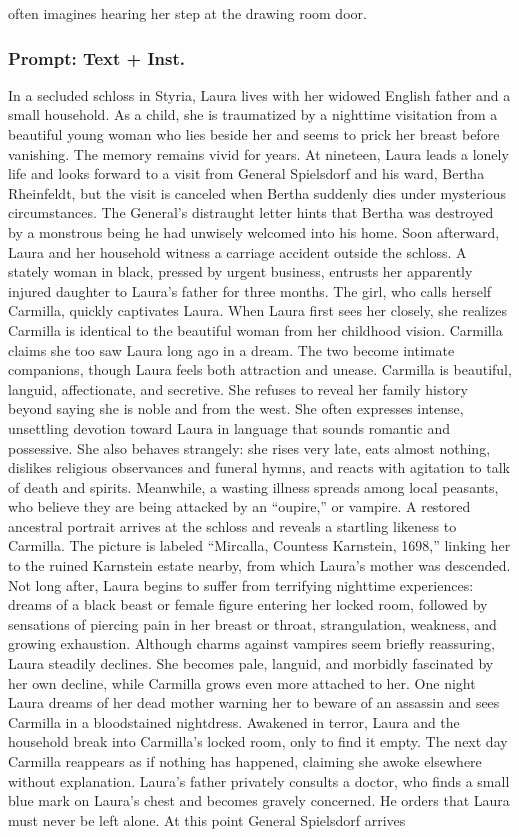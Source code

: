 \documentclass{article} %
\begin{document}
often imagines hearing her step at the drawing room door.

\subsubsection{Prompt: Text + Inst.}

In a secluded schloss in Styria, Laura lives with her widowed English father and a small household. As a child, she is traumatized by a nighttime visitation from a beautiful young woman who lies beside her and seems to prick her breast before vanishing. The memory remains vivid for years. At nineteen, Laura leads a lonely life and looks forward to a visit from General Spielsdorf and his ward, Bertha Rheinfeldt, but the visit is canceled when Bertha suddenly dies under mysterious circumstances. The General’s distraught letter hints that Bertha was destroyed by a monstrous being he had unwisely welcomed into his home. Soon afterward, Laura and her household witness a carriage accident outside the schloss. A stately woman in black, pressed by urgent business, entrusts her apparently injured daughter to Laura’s father for three months. The girl, who calls herself Carmilla, quickly captivates Laura. When Laura first sees her closely, she realizes Carmilla is identical to the beautiful woman from her childhood vision. Carmilla claims she too saw Laura long ago in a dream. The two become intimate companions, though Laura feels both attraction and unease. Carmilla is beautiful, languid, affectionate, and secretive. She refuses to reveal her family history beyond saying she is noble and from the west. She often expresses intense, unsettling devotion toward Laura in language that sounds romantic and possessive. She also behaves strangely: she rises very late, eats almost nothing, dislikes religious observances and funeral hymns, and reacts with agitation to talk of death and spirits. Meanwhile, a wasting illness spreads among local peasants, who believe they are being attacked by an “oupire,” or vampire. A restored ancestral portrait arrives at the schloss and reveals a startling likeness to Carmilla. The picture is labeled “Mircalla, Countess Karnstein, 1698,” linking her to the ruined Karnstein estate nearby, from which Laura’s mother was descended. Not long after, Laura begins to suffer from terrifying nighttime experiences: dreams of a black beast or female figure entering her locked room, followed by sensations of piercing pain in her breast or throat, strangulation, weakness, and growing exhaustion. Although charms against vampires seem briefly reassuring, Laura steadily declines. She becomes pale, languid, and morbidly fascinated by her own decline, while Carmilla grows even more attached to her. One night Laura dreams of her dead mother warning her to beware of an assassin and sees Carmilla in a bloodstained nightdress. Awakened in terror, Laura and the household break into Carmilla’s locked room, only to find it empty. The next day Carmilla reappears as if nothing has happened, claiming she awoke elsewhere without explanation. Laura’s father privately consults a doctor, who finds a small blue mark on Laura’s chest and becomes gravely concerned. He orders that Laura must never be left alone. At this point General Spielsdorf arrives 
\end{document}
